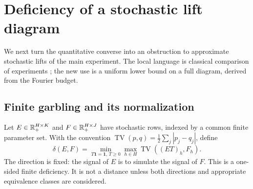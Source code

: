 \section{Deficiency of a stochastic lift diagram}\label{sec:deficiency34}
We next turn the quantitative converse into an obstruction to approximate
stochastic lifts of the main experiment. The local language is classical
comparison of experiments \cite{Blackwell,Torgersen}; the new use is a
uniform lower bound on a full diagram, derived from the Fourier budget.

\subsection{Finite garbling and its normalization}
Let $E\in\mathbb R_+^{H\times K}$ and $F\in\mathbb R_+^{H\times J}$ have stochastic
rows, indexed by a common finite parameter set. With the convention
$\operatorname{TV}(p,q)=\frac12\sum_j|p_j-q_j|$, define
\begin{equation}\label{eq:deficiency34}
 \delta(E,F)=\min_{T\mathbf1=\mathbf1,\,T\ge0}
                    \max_{h\in H}\operatorname{TV}((ET)_h,F_h).
\end{equation}
The direction is fixed: the signal of $E$ is to simulate the signal of $F$.
This is a one-sided finite deficiency. It is not a distance unless both
directions and appropriate equivalence classes are considered.

